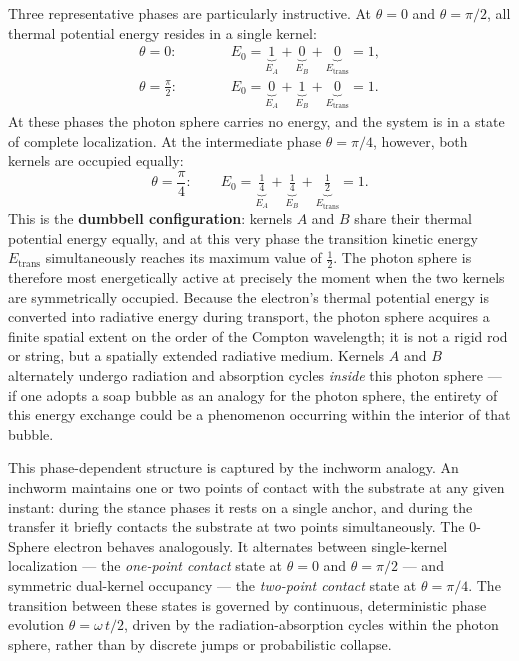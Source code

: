 \documentclass[12pt,letterpaper]{article}
\begin{document}
Three representative phases are particularly instructive. At $\theta = 0$ and $\theta = \pi/2$, all thermal potential energy resides in a single kernel:
\begin{align}
  \theta = 0:\qquad\quad &E_0 = \underbrace{1}_{E_A} + \underbrace{0}_{E_B} + \underbrace{0}_{E_{\mathrm{trans}}} = 1, \\[6pt]
  \theta = \frac{\pi}{2}:\qquad &E_0 = \underbrace{0}_{E_A} + \underbrace{1}_{E_B} + \underbrace{0}_{E_{\mathrm{trans}}} = 1.
\end{align}
At these phases the photon sphere carries no energy, and the system is in a state of complete localization. At the intermediate phase $\theta = \pi/4$, however, both kernels are occupied equally:
\begin{equation}
  \theta = \frac{\pi}{4}:\qquad E_0 = \underbrace{\tfrac{1}{4}}_{E_A} + \underbrace{\tfrac{1}{4}}_{E_B} + \underbrace{\tfrac{1}{2}}_{E_{\mathrm{trans}}} = 1.
\end{equation}
This is the \textbf{dumbbell configuration}: kernels $A$ and $B$ share their thermal potential energy equally, and at this very phase the transition kinetic energy $E_{\mathrm{trans}}$ simultaneously reaches its maximum value of $\tfrac{1}{2}$. The photon sphere is therefore most energetically active at precisely the moment when the two kernels are symmetrically occupied. Because the electron's thermal potential energy is converted into radiative energy during transport, the photon sphere acquires a finite spatial extent on the order of the Compton wavelength; it is not a rigid rod or string, but a spatially extended radiative medium. Kernels $A$ and $B$ alternately undergo radiation and absorption cycles \textit{inside} this photon sphere --- if one adopts a soap bubble as an analogy for the photon sphere, the entirety of this energy exchange could be a phenomenon occurring within the interior of that bubble.

This phase-dependent structure is captured by the inchworm analogy. An inchworm maintains one or two points of contact with the substrate at any given instant: during the stance phases it rests on a single anchor, and during the transfer it briefly contacts the substrate at two points simultaneously. The 0-Sphere electron behaves analogously. It alternates between single-kernel localization --- the \textit{one-point contact} state at $\theta = 0$ and $\theta = \pi/2$ --- and symmetric dual-kernel occupancy --- the \textit{two-point contact} state at $\theta = \pi/4$. The transition between these states is governed by continuous, deterministic phase evolution $\theta = \omega\,t/2$, driven by the radiation-absorption cycles within the photon sphere, rather than by discrete jumps or probabilistic collapse.
\end{document}
